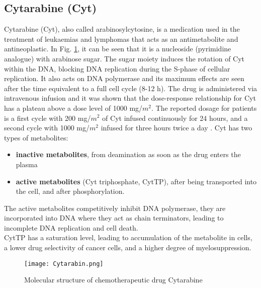 \subsection{Cytarabine (Cyt)}
Cytarabine (Cyt), also called arabinosylcytosine, is a medication used in the treatment of leukaemias and lymphomas that acts as an antimetabolite and antineoplastic. In Fig. \ref{fig:Cyt}, it can be seen that it is a nucleoside (pyrimidine analogue) with arabinose sugar.
The sugar moiety induces the rotation of Cyt within the DNA, blocking DNA replication during the S-phase of cellular replication. It also acts on DNA polymerase and its maximum effects are seen after the time equivalent to a full cell cycle (8-12 h). 
The drug is administered via intravenous infusion and it was shown that the dose-response relationship for Cyt has a plateau above a dose level of 1000 mg/$m^2$. The reported dosage for patients is a first cycle with 200 mg/$m^2$ of Cyt infused continuously for 24 hours, and a second cycle with 1000 mg/$m^2$ infused for three hours twice a day \cite{cyt-3}.
Cyt has two types of metabolites: 
\begin{itemize}
	\item \textbf{inactive metabolites}, from deamination as soon as the drug enters the plasma
	\item \textbf{active metabolites} (Cyt triphosphate, CytTP), after being transported into the cell, and after phosphorylation.
\end{itemize}
The active metabolites competitively inhibit DNA polymerase, they are incorporated into DNA where they act as chain terminators, leading to incomplete DNA replication and cell death.\\
CytTP has a saturation level, leading to accumulation of the metabolite in cells, a lower drug selectivity of cancer cells, and a higher degree of myelosuppression\cite{cyt-1, cyt-2}.
\begin{figure}[htbp!]
	\centering
	\texttt{[image: Cytarabin.png]}
	\caption{Molecular structure of chemotherapeutic drug Cytarabine}
	\label{fig:Cyt}
\end{figure}
